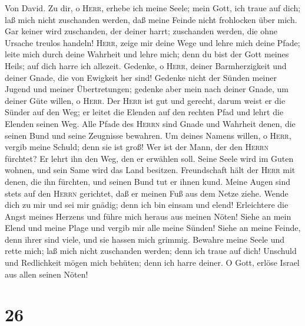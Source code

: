  Von David. Zu dir, o \textsc{Herr}, erhebe ich meine
Seele;  mein Gott, ich traue auf dich; laß mich nicht
zuschanden werden, daß meine Feinde nicht frohlocken über mich.
 Gar keiner wird zuschanden, der deiner harrt; zuschanden
werden, die ohne Ursache treulos handeln!  \textsc{Herr},
zeige mir deine Wege und lehre mich deine Pfade;  leite
mich durch deine Wahrheit und lehre mich; denn du bist der Gott meines
Heils; auf dich harre ich allezeit.  Gedenke, o
\textsc{Herr}, deiner Barmherzigkeit und deiner Gnade, die von Ewigkeit
her sind!  Gedenke nicht der Sünden meiner Jugend und
meiner Übertretungen; gedenke aber mein nach deiner Gnade, um deiner
Güte willen, o \textsc{Herr}.  Der \textsc{Herr} ist gut
und gerecht, darum weist er die Sünder auf den Weg;  er
leitet die Elenden auf den rechten Pfad und lehrt die Elenden seinen
Weg.  Alle Pfade des \textsc{Herrn} sind Gnade und
Wahrheit denen, die seinen Bund und seine Zeugnisse bewahren.
 Um deines Namens willen, o \textsc{Herr}, vergib meine
Schuld; denn sie ist groß!  Wer ist der Mann, der den
\textsc{Herrn} fürchtet? Er lehrt ihn den Weg, den er erwählen soll.
 Seine Seele wird im Guten wohnen, und sein Same wird das
Land besitzen.  Freundschaft hält der \textsc{Herr} mit
denen, die ihn fürchten, und seinen Bund tut er ihnen kund.
 Meine Augen sind stets auf den \textsc{Herrn} gerichtet,
daß er meinen Fuß aus dem Netze ziehe.  Wende dich zu mir
und sei mir gnädig; denn ich bin einsam und elend! 
Erleichtere die Angst meines Herzens und führe mich heraus aus meinen
Nöten!  Siehe an mein Elend und meine Plage und vergib
mir alle meine Sünden!  Siehe an meine Feinde, denn ihrer
sind viele, und sie hassen mich grimmig.  Bewahre meine
Seele und rette mich; laß mich nicht zuschanden werden; denn ich traue
auf dich!  Unschuld und Redlichkeit mögen mich behüten;
denn ich harre deiner.  O Gott, erlöse Israel aus allen
seinen Nöten!

\hypertarget{section-25}{%
\section{26}\label{section-25}}

